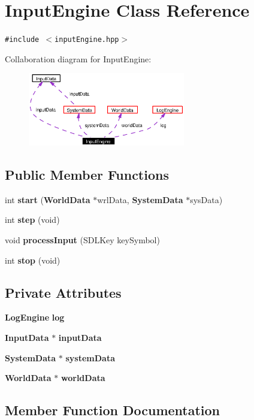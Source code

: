 \section{Input\-Engine Class Reference}
\label{classInputEngine}
{\tt \#include $<$input\-Engine.hpp$>$}

Collaboration diagram for Input\-Engine:\begin{figure}[H]
\begin{center}
\leavevmode
\includegraphics[width=194pt]{classInputEngine__coll__graph}
\end{center}
\end{figure}
\subsection*{Public Member Functions}
\begin{CompactItemize}
\item 
int {\bf start} ({\bf World\-Data} $\ast$wrl\-Data, {\bf System\-Data} $\ast$sys\-Data)
\item 
int {\bf step} (void)
\item 
void {\bf process\-Input} (SDLKey key\-Symbol)
\item 
int {\bf stop} (void)
\end{CompactItemize}
\subsection*{Private Attributes}
\begin{CompactItemize}
\item 
{\bf Log\-Engine} {\bf log}
\item 
{\bf Input\-Data} $\ast$ {\bf input\-Data}
\item 
{\bf System\-Data} $\ast$ {\bf system\-Data}
\item 
{\bf World\-Data} $\ast$ {\bf world\-Data}
\end{CompactItemize}


\subsection{Member Function Documentation}
